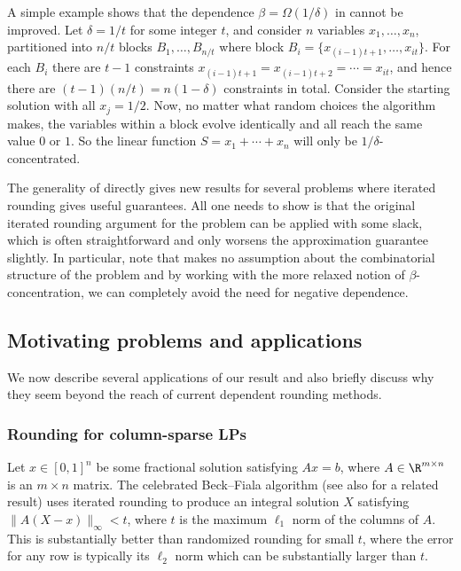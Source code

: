 \documentclass{toc}
\begin{document}
\begin{remark} A simple example shows that the dependence $\beta = \Omega(1/\delta)$ in
 cannot be improved.
Let $\delta=1/t$ for some integer $t$, and consider $n$ variables $x_1,\ldots,x_n$, partitioned into $n/t$ blocks $B_1,\ldots,B_{n/t}$ where block $B_i = \{x_{(i-1)t+1}, \ldots, x_{it}\}$.
For each $B_i$ there are
$t-1$ constraints $x_{(i-1)t+1} =  x_{(i-1)t+2} =  \cdots = x_{it}$, and hence there are $(t-1)(n/t) = n(1-\delta)$ constraints in total.
Consider the starting solution with all $x_j=1/2$.
Now, no matter what random choices the algorithm makes, the variables within a block evolve identically and all reach the same value $0$ or $1$.
%
So the linear function $S=x_1+\cdots+x_n$ will only be $1/\delta$-concentrated.
\end{remark}
%


The generality of  directly gives new results for several problems where iterated rounding gives useful guarantees. All one needs to show is that the original iterated rounding argument for the problem
can be applied with some slack, which is often straightforward and only worsens the approximation guarantee slightly. 
%
In particular, note that  makes no assumption about the combinatorial structure of the problem and by working with the more relaxed notion of  $\beta$-concentration, we can completely avoid the need for negative dependence.





%
%


%
\subsection{Motivating problems and applications}    %
\label{s:appl}
We now describe several applications of our result and also briefly discuss why they seem beyond the reach of current dependent rounding methods.
\subsubsection{Rounding  for column-sparse LPs}
Let $x \in [0,1]^n$ be some fractional solution satisfying $Ax = b$, where $A \in \R^{m \times n}$ is an $m \times n$ matrix.
The celebrated Beck--Fiala algorithm \cite{BF81} (see also \cite{KarpLRTVV87} for a related result) uses iterated rounding to produce an integral solution $X$ satisfying $\|A(X-x)\|_\infty < t$, where $t$ is the maximum $\ell_1$ norm of the columns of $A$. This is substantially better than randomized rounding for small $t$, where the error for any row is typically its $\ell_2$ norm which can be substantially larger than $t$.
\end{document}

